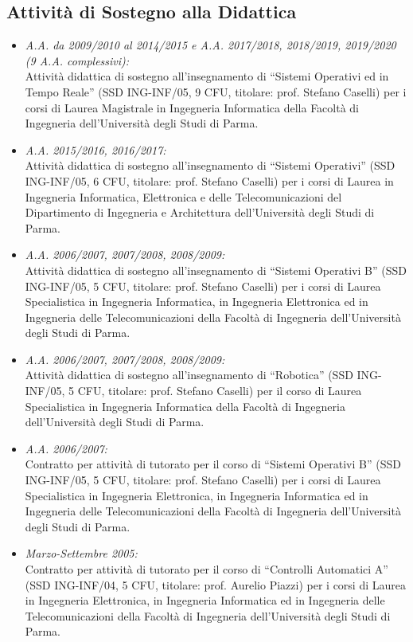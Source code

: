 \documentclass[11pt]{article}
\newcommand{\ITEMDATE}[1]{\item \textit{#1:}\\}
\begin{document}
\subsection*{Attivit\`a di Sostegno alla Didattica}

\begin{itemize}

\ITEMDATE{A.A. da 2009/2010 al 2014/2015 e A.A. 2017/2018, 2018/2019, 2019/2020 (9 A.A. complessivi)} 
Attivit\`a didattica di sostegno all'insegnamento di ``Sistemi Operativi ed in Tempo Reale'' 
(SSD ING-INF/05, 9 CFU, titolare: prof. Stefano Caselli)
per i corsi di Laurea Magistrale in Ingegneria Informatica
della Facolt\`a di Ingegneria dell'Universit\`a degli Studi di Parma.

\ITEMDATE{A.A. 2015/2016, 2016/2017} 
Attivit\`a didattica di sostegno all'insegnamento di ``Sistemi Operativi'' 
(SSD ING-INF/05, 6 CFU, titolare: prof. Stefano Caselli)
per i corsi di Laurea in Ingegneria Informatica, Elettronica e delle Telecomunicazioni
del Dipartimento di Ingegneria e Architettura dell'Universit\`a degli Studi di Parma.

\ITEMDATE{A.A. 2006/2007, 2007/2008, 2008/2009} 
Attivit\`a didattica di sostegno all'insegnamento di ``Sistemi Operativi B'' (SSD ING-INF/05, 5 CFU, titolare: prof. Stefano Caselli)
per i corsi di Laurea Specialistica in Ingegneria Informatica, in Ingegneria Elettronica ed in Ingegneria delle Telecomunicazioni
della Facolt\`a di Ingegneria dell'Universit\`a degli Studi di Parma.

\ITEMDATE{A.A. 2006/2007, 2007/2008, 2008/2009} 
Attivit\`a didattica di sostegno all'insegnamento di ``Robotica'' (SSD ING-INF/05, 5 CFU, titolare: prof. Stefano Caselli)
per il corso di Laurea Specialistica in Ingegneria Informatica 
della Facolt\`a di Ingegneria dell'Universit\`a degli Studi di Parma.

\ITEMDATE{A.A. 2006/2007} 
Contratto per attivit\`a di tutorato per il corso di ``Sistemi Operativi B'' (SSD ING-INF/05, 5 CFU, titolare: prof. Stefano Caselli)
per i corsi di Laurea Specialistica in Ingegneria Elettronica, in Ingegneria Informatica ed in Ingegneria delle Telecomunicazioni 
della Facolt\`a di Ingegneria dell'Universit\`a degli Studi di Parma.

\ITEMDATE{Marzo-Settembre 2005}
Contratto per attivit\`a di tutorato per il corso di ``Controlli Automatici A'' (SSD ING-INF/04, 5 CFU, titolare: prof. Aurelio Piazzi) 
per i corsi di Laurea in Ingegneria Elettronica, in Ingegneria Informatica ed in Ingegneria delle Telecomunicazioni 
della Facolt\`a di Ingegneria dell'Universit\`a degli Studi di Parma. 
\end{itemize}
\end{document}
